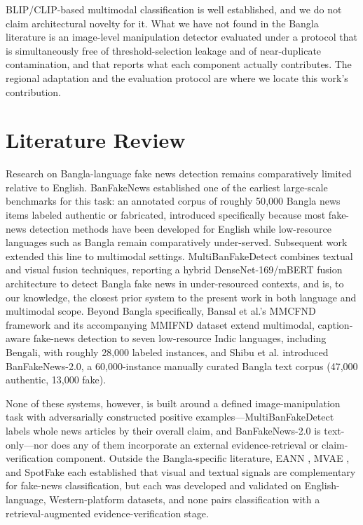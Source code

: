 \documentclass[conference,a4paper]{IEEEtran}
\begin{document}
BLIP/CLIP-based multimodal classification is well established, and we do not
claim architectural novelty for it. What we have not found in the Bangla
literature is an image-level manipulation detector evaluated under a protocol
that is simultaneously free of threshold-selection leakage and of
near-duplicate contamination, and that reports what each component actually
contributes. The regional adaptation and the evaluation protocol are where we
locate this work's contribution.

\section{Literature Review}

Research on Bangla-language fake news detection remains comparatively limited
relative to English. BanFakeNews \cite{banfakenews} established one of the
earliest large-scale benchmarks for this task: an annotated corpus of roughly
50{,}000 Bangla news items labeled authentic or fabricated, introduced
specifically because most fake-news detection methods have been developed for
English while low-resource languages such as Bangla remain comparatively
under-served. Subsequent work extended this line to multimodal settings.
MultiBanFakeDetect \cite{multibanfake} combines textual and visual fusion
techniques, reporting a hybrid DenseNet-169/mBERT fusion architecture to
detect Bangla fake news in under-resourced contexts, and is, to our knowledge,
the closest prior system to the present work in both language and multimodal
scope. Beyond Bangla specifically, Bansal et al.'s MMCFND framework and its
accompanying MMIFND dataset \cite{mmcfnd} extend multimodal, caption-aware
fake-news detection to seven low-resource Indic languages, including Bengali,
with roughly 28{,}000 labeled instances, and Shibu et al. \cite{banfakenews2}
introduced BanFakeNews-2.0, a 60{,}000-instance manually curated Bangla text
corpus (47{,}000 authentic, 13{,}000 fake).

None of these systems, however, is built around a defined image-manipulation
task with adversarially constructed positive examples---MultiBanFakeDetect
labels whole news articles by their overall claim, and BanFakeNews-2.0 is
text-only---nor does any of them incorporate an external evidence-retrieval or
claim-verification component. Outside the Bangla-specific literature, EANN
\cite{eann}, MVAE \cite{mvae}, and SpotFake \cite{spotfake} each established
that visual and textual signals are complementary for fake-news
classification, but each was developed and validated on English-language,
Western-platform datasets, and none pairs classification with a
retrieval-augmented evidence-verification stage.
\end{document}
